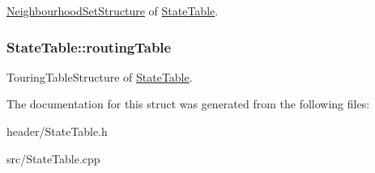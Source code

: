 \hyperlink{structNeighbourhoodSetStructure}{Neighbourhood\-Set\-Structure} of \hyperlink{structStateTable}{State\-Table}. \hypertarget{structStateTable_a8ccc728c639db2384c4eed11a8f3d484}{
\subsubsection[{routing\-Table}]{ State\-Table\-::routing\-Table}}\label{structStateTable_a8ccc728c639db2384c4eed11a8f3d484}
Touring\-Table\-Structure of \hyperlink{structStateTable}{State\-Table}. 

The documentation for this struct was generated from the following files\-:\begin{DoxyCompactItemize}
\item 
header/State\-Table.\-h\item 
src/State\-Table.\-cpp\end{DoxyCompactItemize}
